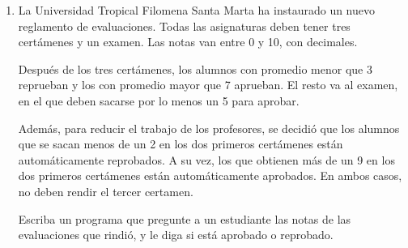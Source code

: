 \documentclass[11pt,spanish]{article}
\newcommand{\pond}[1]{[{\small\textbf{#1\%}}]}
\begin{document}
\begin{enumerate}[font=\Large\bfseries]
    \newpage
    \item
      \pond{25}
      La Universidad Tropical Filomena Santa Marta
      ha instaurado un nuevo reglamento de evaluaciones.
      Todas las asignaturas deben tener tres certámenes y un examen.
      Las notas van entre 0 y 10, con decimales.

      Después de los tres certámenes,
      los alumnos con promedio menor que 3 reprueban y
      los con promedio mayor que 7 aprueban.
      El resto va al examen,
      en el que deben sacarse por lo menos un 5 para aprobar.

      Además,
      para reducir el trabajo de los profesores,
      se decidió que los alumnos que se sacan menos de un 2
      en los dos primeros certámenes
      están automáticamente reprobados.
      A su vez,
      los que obtienen más de un 9
      en los dos primeros certámenes
      están automáticamente aprobados.
      En ambos casos,
      no deben rendir el tercer certamen.

      Escriba un programa que pregunte a un estudiante
      las notas de las evaluaciones que rindió,
      y le diga si está aprobado o reprobado.

      \begin{minipage}[t]{.2\textwidth}
        
      \end{minipage}
      \hfil
      \begin{minipage}[t]{.2\textwidth}
        
      \end{minipage}
      \hfil
      \begin{minipage}[t]{.2\textwidth}
        
      \end{minipage}
      \hfil
      \begin{minipage}[t]{.2\textwidth}
        
      \end{minipage}


\end{enumerate}
\end{document}
